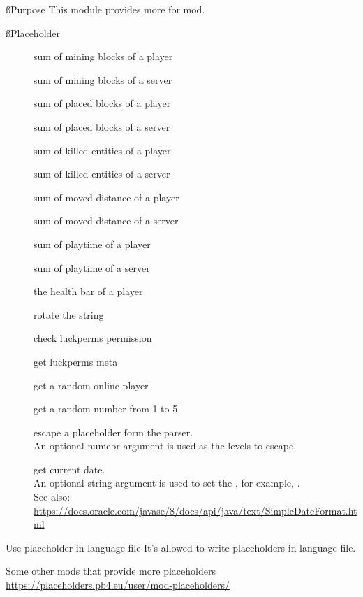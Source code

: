 \ss{Purpose}
This module provides more  for  mod.

\ss{Placeholder}
\begin{description}
    \item [] sum of mining blocks of a player
    \item[] sum of mining blocks of a server
    \item[] sum of placed blocks of a player
    \item[] sum of placed blocks of a server
    \item[] sum of killed entities of a player
    \item[] sum of killed entities of a server
    \item[] sum of moved distance of a player
    \item[] sum of moved distance of a server
    \item[] sum of playtime of a player
    \item[] sum of playtime of a server
    \item[] the health bar of a player
    \item[] rotate the string 
    \item[] check luckperms permission
    \item[] get luckperms meta
    \item[] get a random online player
    \item[] get a random number from 1 to 5
    \item[] escape a placeholder form the parser.\\An optional numebr argument is used as the levels to escape.
    \item[] get current date.\\An optional string argument is used to set the , for example, .\\See also: \url{https://docs.oracle.com/javase/8/docs/api/java/text/SimpleDateFormat.html}
\end{description}

\begin{tips}{Use placeholder in language file}
    It's allowed to write placeholders in language file.
\end{tips}

\begin{note}{Some other mods that provide more placeholders}
    \url{https://placeholders.pb4.eu/user/mod-placeholders/}
\end{note}



